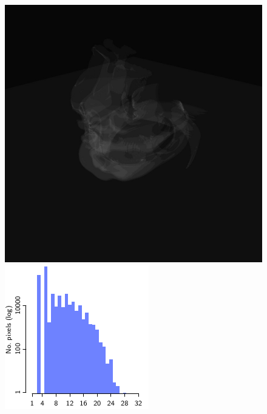 \documentclass{egpubl}
\newlength{\boxheight}
\begin{document}
\begin{figure}[p]
\begin{minipage}[b][\boxheight][b]{0.24\linewidth}
\begin{minipage}[t]{0.98\linewidth}
      \includegraphics[width=\linewidth]{snapshots/space/space_dci-wp64.jpg}%
    \end{minipage}%
    \vfill%
    \begin{minipage}[b]{0.98\linewidth}
      \centering
      \includegraphics[width=1\linewidth]{figures/plot-dch-space}\vspace{-2mm}

\end{minipage}
\end{minipage}
\end{figure}
\end{document}
